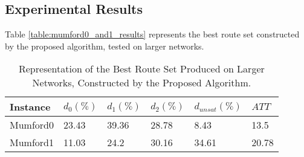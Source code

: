 \subsection{Experimental Results}
\label{subsec:scalabilityExperiments_results}


Table \vref{table:mumford0_and1_results} represents the best route set constructed by the proposed algorithm, tested on larger networks.

\begin{table}[H]
    \centering
    \hspace*{-1.0cm}
    \begin{tabular}{|l|l|l|l|l|l|}
        \hline
        Instance &  $d_0(\%)$ & $d_1(\%)$ & $d_2(\%)$ & $d_{unsat}(\%)$ & $ATT$\\
        \hline
        Mumford0 & 23.43 & 39.36 & 28.78 & 8.43 & 13.5\\
        Mumford1 & 11.03 & 24.2 & 30.16 & 34.61 & 20.78\\
        \hline
    \end{tabular}
    \caption{Representation of the Best Route Set Produced on Larger Networks, Constructed by the Proposed Algorithm.}
    \label{table:mumford0_and1_results}
\end{table}

